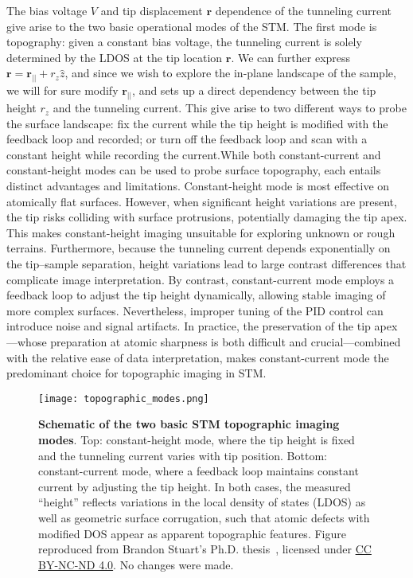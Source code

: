 \noindent The bias voltage $V$ and tip displacement $\mathbf{r}$ dependence of the tunneling current give arise to the two basic operational modes of the \ac{STM}. The first mode is topography: given a constant bias voltage, the tunneling current is solely determined by the \ac{LDOS} at the tip location $\mathbf{r}$. We can further express $\mathbf{r} = \mathbf{r_{||}} + r_z \hat{z}$, and since we wish to explore the in-plane landscape of the sample, we will for sure modify $\mathbf{r_{||}}$, and sets up a direct dependency between the tip height $r_z$ and the tunneling current. This give arise to two different ways to probe the surface landscape: fix the current while the tip height is modified with the feedback loop and recorded; or turn off the feedback loop and scan with a constant height while recording the current.While both constant-current and constant-height modes can be used to probe surface topography, each entails distinct advantages and limitations. Constant-height mode is most effective on atomically flat surfaces. However, when significant height variations are present, the tip risks colliding with surface protrusions, potentially damaging the tip apex. This makes constant-height imaging unsuitable for exploring unknown or rough terrains. Furthermore, because the tunneling current depends exponentially on the tip–sample separation, height variations lead to large contrast differences that complicate image interpretation. By contrast, constant-current mode employs a feedback loop to adjust the tip height dynamically, allowing stable imaging of more complex surfaces. Nevertheless, improper tuning of the PID control can introduce noise and signal artifacts. In practice, the preservation of the tip apex—whose preparation at atomic sharpness is both difficult and crucial—combined with the relative ease of data interpretation, makes constant-current mode the predominant choice for topographic imaging in STM. 

\begin{figure}
	\centering
	\texttt{[image: topographic\_modes.png]}
	\caption[\textbf{Schematic of the two basic STM topographic imaging modes}]{\textbf{Schematic of the two basic STM topographic imaging modes}. Top: constant-height mode, where the tip height is fixed and the tunneling current varies with tip position. Bottom: constant-current mode, where a feedback loop maintains constant current by adjusting the tip height. In both cases, the measured “height” reflects variations in the local density of states (LDOS) as well as geometric surface corrugation, such that atomic defects with modified DOS appear as apparent topographic features. Figure reproduced from Brandon Stuart's Ph.D. thesis~\cite{stuartScanningTunnellingMicroscopy2021}, licensed under  \href{https://creativecommons.org/licenses/by-nc-nd/4.0/}{CC BY-NC-ND 4.0}. No changes were made.}
	\label{fig:topo_modes}
\end{figure}

